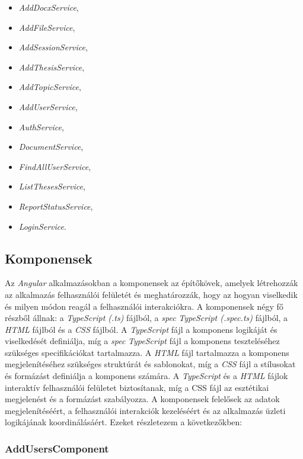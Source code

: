 \begin{itemize}

\item{\textit{AddDocxService}},
\item{\textit{AddFileService}},
\item{\textit{AddSessionService}},
\item{\textit{AddThesisService}},
\item{\textit{AddTopicService}},
\item{\textit{AddUserService}},
\item{\textit{AuthService}},
\item{\textit{DocumentService}},
\item{\textit{FindAllUserService}},
\item{\textit{ListThesesService}},
\item{\textit{ReportStatusService}},
\item{\textit{LoginService}}.

\end{itemize}

\subsection{Komponensek}

Az \textit{Angular} alkalmazásokban a komponensek az építőkövek, amelyek létrehozzák az alkalmazás felhasználói felületét és meghatározzák, hogy az hogyan viselkedik és milyen módon reagál a felhasználói interakciókra. A komponensek négy fő részből állnak: a \textit{TypeScript (.ts)} fájlból, a \textit{spec} \textit{TypeScript (.spec.ts)} fájlból, a \textit{HTML} fájlból és a \textit{CSS} fájlból. A \textit{TypeScript} fájl a komponens logikáját és viselkedését definiálja, míg a \textit{spec} \textit{TypeScript} fájl a komponens teszteléséhez szükséges specifikációkat tartalmazza. A \textit{HTML} fájl tartalmazza a komponens megjelenítéséhez szükséges struktúrát és sablonokat, míg a \textit{CSS} fájl a stílusokat és formázást definiálja a komponens számára. A \textit{TypeScript} és a \textit{HTML} fájlok interaktív felhasználói felületet biztosítanak, míg a CSS fájl az esztétikai megjelenést és a formázást szabályozza. A komponensek felelősek az adatok megjelenítéséért, a felhasználói interakciók kezeléséért és az alkalmazás üzleti logikájának koordinálásáért. Ezeket részletezem a következőkben:

\subsubsection{AddUsersComponent}

